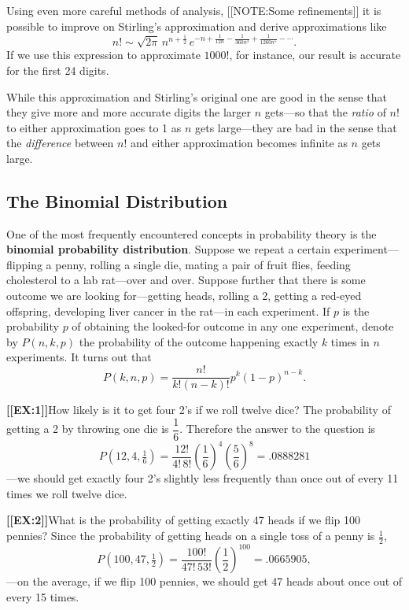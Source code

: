 Using even more careful methods of analysis, 
[[NOTE:Some refinements]]
it is possible to improve on Stirling's approximation and derive
approximations like
\[
n!\sim \sqrt{2\pi}\,n^{n+\frac{1}{2}}\,
     e^{-n+\frac{1}{12n}-\frac{1}{360n^3}+\frac{1}{1260n^5}-\cdots}.
\] 
If we use this expression to approximate $1000!$, for instance, our
result is accurate for the first 24 digits.

While this approximation and Stirling's original one are good in the
sense that they give more and more accurate digits the larger $n$
gets---so that the {\em ratio} of $n!$ to either approximation goes to
1 as $n$ gets large---they are bad in the sense that the {\em
  difference} between $n!$ and either approximation becomes infinite
as $n$ gets large.

\subsection{The Binomial Distribution}
\label{subsec:the-binomial-distribution}

One of the most frequently encountered concepts in probability theory
is the {\bf binomial probability distribution}. Suppose we repeat a
certain experiment---flipping a penny, rolling a single die, mating a
pair of fruit flies, feeding cholesterol to a lab rat---over and over.
Suppose further that there is some outcome we are looking
for---getting heads, rolling a 2, getting a red-eyed offspring,
developing liver cancer in the rat---in each experiment.  If $p$ is
the probability $p$ of obtaining the looked-for outcome in any one
experiment, denote by $P(n, k, p)$ the probability of the outcome
happening exactly $k$ times in $n$ experiments.  It turns out that
\[
P(k,n, p)=\dfrac{n!}{k!(n-k)!}p^k(1-p)^{n-k}.
\]





{\bf [[EX:1]]}\quad How likely is it to get four 2's if we roll
twelve dice?  The probability of getting a 2 by throwing one die is
$\dfrac{1}{6}$.  Therefore the answer to the question is
\[
P(12, 4, \tfrac{1}{6})= \dfrac{12!}{4!\, 8!}
   \left(\dfrac{1}{6}\right)^4\left(\dfrac{5}{6}\right)^8=.0888281
\] 
---we should get exactly four 2's slightly less frequently than once
out of every 11 times we roll twelve dice.





{\bf [[EX:2]]}\quad What is the probability of getting exactly 47
heads if we flip 100 pennies? Since the probability of getting heads
on a single toss of a penny is $\frac{1}{2}$,
\[
P(100, 47, \tfrac{1}{2}) 
 = \dfrac{100!}{47!\,53!}\left(\dfrac{1}{2}\right)^{100}=.0665905,
\]
---on the average, if we flip 100 pennies, we should get 47 heads
about once out of every 15 times.




